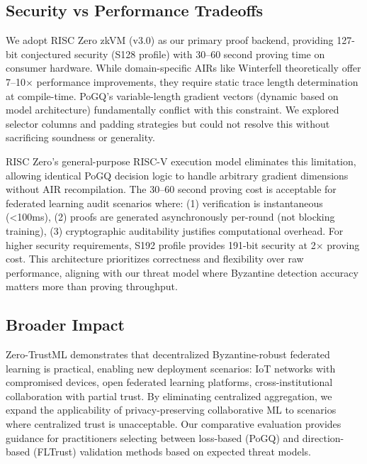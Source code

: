 \subsection{Security vs Performance Tradeoffs}

We adopt RISC Zero zkVM (v3.0) as our primary proof backend, providing 127-bit conjectured security (S128 profile) with 30--60 second proving time on consumer hardware. While domain-specific AIRs like Winterfell theoretically offer 7--10$\times$ performance improvements, they require static trace length determination at compile-time. PoGQ's variable-length gradient vectors (dynamic based on model architecture) fundamentally conflict with this constraint. We explored selector columns and padding strategies but could not resolve this without sacrificing soundness or generality.

RISC Zero's general-purpose RISC-V execution model eliminates this limitation, allowing identical PoGQ decision logic to handle arbitrary gradient dimensions without AIR recompilation. The 30--60 second proving cost is acceptable for federated learning audit scenarios where: (1) verification is instantaneous (<100ms), (2) proofs are generated asynchronously per-round (not blocking training), (3) cryptographic auditability justifies computational overhead. For higher security requirements, S192 profile provides 191-bit security at 2$\times$ proving cost. This architecture prioritizes correctness and flexibility over raw performance, aligning with our threat model where Byzantine detection accuracy matters more than proving throughput.

\subsection{Broader Impact}

Zero-TrustML demonstrates that decentralized Byzantine-robust federated learning is practical, enabling new deployment scenarios: IoT networks with compromised devices, open federated learning platforms, cross-institutional collaboration with partial trust. By eliminating centralized aggregation, we expand the applicability of privacy-preserving collaborative ML to scenarios where centralized trust is unacceptable. Our comparative evaluation provides guidance for practitioners selecting between loss-based (PoGQ) and direction-based (FLTrust) validation methods based on expected threat models.
